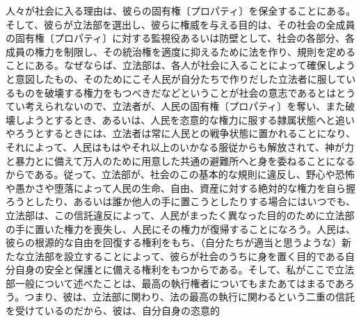人々が社会に入る理由は、彼らの固有権〔プロパティ〕を保全することにある。そして、彼らが立法部を選出し、彼らに権威を与える目的は、その社会の全成員の固有権〔プロパティ〕に対する監視役あるいは防壁として、社会の各部分、各成員の権力を制限し、その統治権を適度に抑えるために法を作り、規則を定めることにある。なぜならば、立法部は、各人が社会に入ることによって確保しようと意図したもの、そのためにこそ人民が自分たちで作りだした立法者に服しているものを破壊する権力をもつべきだなどということが社会の意志であるとはとうてい考えられないので、立法者が、人民の固有権〔プロパティ〕を奪い、また破壊しようとするとき、あるいは、人民を恣意的な権力に服する隷属状態へと追いやろうとするときには、立法者は常に人民との戦争状態に置かれることになり、それによって、人民はもはやそれ以上のいかなる服従からも解放されて、神が力と暴力とに備えて万人のために用意した共通の避難所へと身を委ねることになるからである。従って、立法部が、社会のこの基本的な規則に違反し、野心や恐怖や愚かさや堕落によって人民の生命、自由、資産に対する絶対的な権力を自ら握ろうとしたり、あるいは誰か他人の手に置こうとしたりする場合にはいつでも、立法部は、この信託違反によって、人民がまったく異なった目的のために立法部の手に置いた権力を喪失し、人民にその権力が復帰することになろう。人民は、彼らの根源的な自由を回復する権利をもち、（自分たちが適当と思うような）新たな立法部を設立することによって、彼らが社会のうちに身を置く目的である自分自身の安全と保護とに備える権利をもつからである。そして、私がここで立法部一般について述べたことは、最高の執行権者についてもまたあてはまるであろう。つまり、彼は、立法部に関わり、法の最高の執行に関わるという二重の信託を受けているのだから、彼は、自分自身の恣意的
